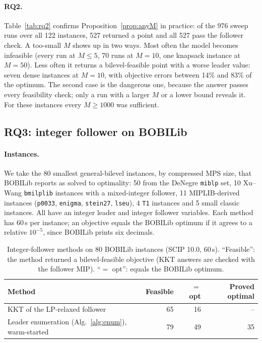 \documentclass[11pt]{article}
\begin{document}
\paragraph{RQ2.} Table~\ref{tab:rq2} confirms Proposition~\ref{prop:anyM} in
practice: of the 976 sweep runs over all 122 instances, 527 returned a
point and all 527 pass the follower check. A too-small $M$
shows up in two ways. Most often the model becomes infeasible (every run at
$M \le 5$, 70 runs at $M = 10$, one knapsack instance at $M = 50$). Less
often it returns a bilevel-feasible point with a worse leader value: seven
dense instances at $M = 10$, with objective errors between 14\% and 83\% of
the optimum. The second case is the dangerous one, because the answer passes
every feasibility check; only a run with a larger $M$ or a lower bound
reveals it. For these instances every $M \ge 1000$ was sufficient.

\subsection{RQ3: integer follower on BOBILib}
\label{sec:eval-int}

\paragraph{Instances.} We take the 80 smallest general-bilevel instances,
by compressed MPS size, that BOBILib reports as solved to optimality: 50 from
the DeNegre \texttt{miblp} set, 10 Xu--Wang \texttt{bmilplib} instances with
a mixed-integer follower, 11 MIPLIB-derived instances (\texttt{p0033},
\texttt{enigma}, \texttt{stein27}, \texttt{lseu}), 4 \texttt{T1}
instances and 5 small classic instances. All have an integer leader and
integer follower variables. Each method has 60\,s per instance; an objective
equals the BOBILib optimum if it agrees to a relative $10^{-5}$, since BOBILib
prints six decimals.

\begin{table}[t]
\centering
\caption{Integer-follower methods on 80 BOBILib instances (SCIP 10.0, 60\,s).
``Feasible'': the method returned a bilevel-feasible objective (KKT answers
are checked with the follower MIP). ``$=$ opt'': equals the BOBILib optimum.}
\label{tab:rq3}
\begin{tabular}{lrrr}
\toprule
Method & Feasible & $=$ opt & Proved optimal \\
\midrule
KKT of the LP-relaxed follower & 65 & 16 & -- \\
Leader enumeration (Alg.~\ref{alg:enum}), warm-started & 79 & 49 & 35 \\
\bottomrule
\end{tabular}
\end{table}
\end{document}
